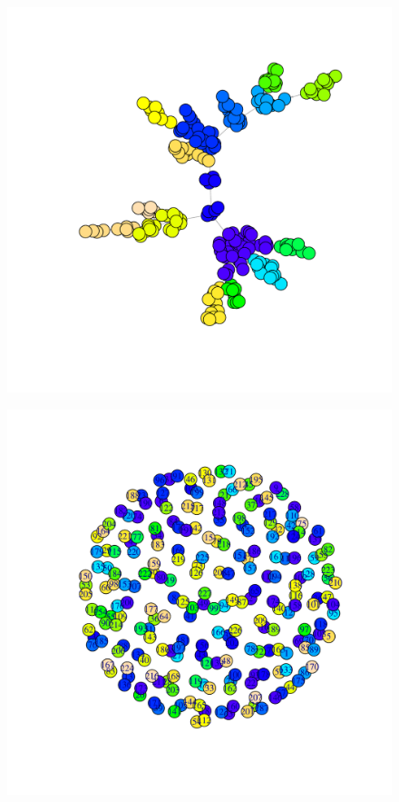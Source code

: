 \begin{figure}[!tp]
	\centering
	\begin{minipage}[!h]{0.7\textwidth}
	\centering
		\includegraphics[width=\textwidth]{fig/01dataint/friendgraph}
		\label{fig:communities}
	\end{minipage}
	\begin{minipage}[!h]{0.7\textwidth}
	\centering
		\includegraphics[width=\textwidth]{fig/01dataint/msggraph}

\end{minipage}
\end{figure}
